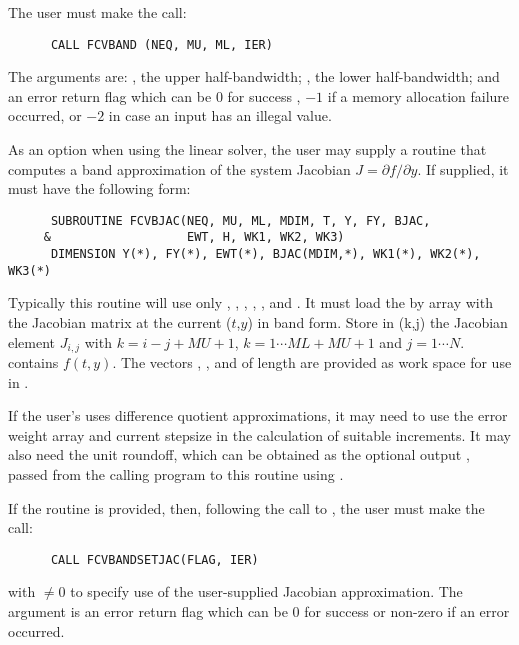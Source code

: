 \begin{Steps}
  The user must make the call:
\begin{verbatim}
      CALL FCVBAND (NEQ, MU, ML, IER)
\end{verbatim}
  The arguments are: , the upper half-bandwidth; , 
  the lower half-bandwidth; and  an error return flag which can be  
  $0$ for success , $-1$ if a memory allocation failure occurred, or $-2$ 
  in case an input has an illegal value.     
  
  As an option when using the {\band} linear solver, the user may supply a
  routine that computes a band approximation of the system Jacobian 
  $J = \partial f / \partial y$. If supplied, it must have the following form:
\begin{verbatim}
      SUBROUTINE FCVBJAC(NEQ, MU, ML, MDIM, T, Y, FY, BJAC,
     &                   EWT, H, WK1, WK2, WK3)
      DIMENSION Y(*), FY(*), EWT(*), BJAC(MDIM,*), WK1(*), WK2(*), WK3(*)
\end{verbatim}
  Typically this routine will use only , , , , 
  , and . 
  It must load the  by  array  with the Jacobian matrix
  at the current ($t$,$y$) in band form.  Store in (k,j) the Jacobian
  element $J_{i,j}$ with $k = i - j + MU + 1$, $k = 1 \cdots ML+MU+1$ and
  $j = 1 \cdots N$.  contains $f(t,y)$. The vectors , ,
  and  of length  are provided as work space for use in
  .

  If the user's  uses difference quotient approximations, it
  may need to use the error weight array  and current stepsize 
  in the calculation of suitable increments.  It may also need the unit
  roundoff, which can be obtained as the optional output ,
  passed from the calling program to this routine using .

  If the  routine is provided, then, following the call to ,
  the user must make the call:
\begin{verbatim}
      CALL FCVBANDSETJAC(FLAG, IER)
\end{verbatim}
  with  $\neq 0$ to specify use of the user-supplied Jacobian approximation.
  The argument  is an error return flag which can be $0$ 
  for success or non-zero if an error occurred.
  

\end{Steps}

